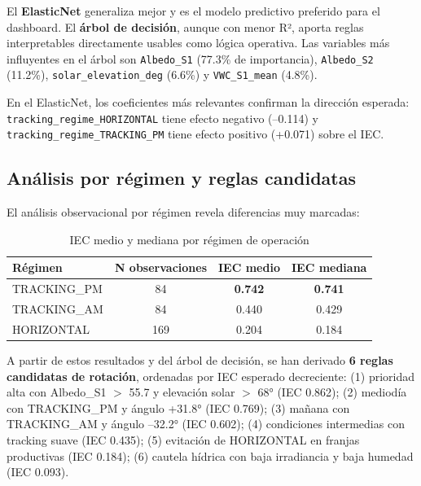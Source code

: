\documentclass[12pt,a4paper]{article}
\begin{document}
El \textbf{ElasticNet} generaliza mejor y es el modelo predictivo preferido para el dashboard. El \textbf{árbol de decisión}, aunque con menor R², aporta reglas interpretables directamente usables como lógica operativa. Las variables más influyentes en el árbol son \texttt{Albedo\_S1} (77.3\% de importancia), \texttt{Albedo\_S2} (11.2\%), \texttt{solar\_elevation\_deg} (6.6\%) y \texttt{VWC\_S1\_mean} (4.8\%).

En el ElasticNet, los coeficientes más relevantes confirman la dirección esperada: \texttt{tracking\_regime\_HORIZONTAL} tiene efecto negativo (--0.114) y \texttt{tracking\_regime\_TRACKING\_PM} tiene efecto positivo (+0.071) sobre el IEC.

\subsection{Análisis por régimen y reglas candidatas}

El análisis observacional por régimen revela diferencias muy marcadas:

\begin{table}[H]
\centering
\caption{IEC medio y mediana por régimen de operación}
\label{tab:regime_s2}
\renewcommand{\arraystretch}{1.3}
\begin{tabular}{lccc}
\toprule
\textbf{Régimen} & \textbf{N observaciones} & \textbf{IEC medio} & \textbf{IEC mediana} \\
\midrule
TRACKING\_PM & 84  & \textbf{0.742} & \textbf{0.741} \\
TRACKING\_AM & 84  & 0.440          & 0.429          \\
HORIZONTAL   & 169 & 0.204          & 0.184          \\
\bottomrule
\end{tabular}
\end{table}

A partir de estos resultados y del árbol de decisión, se han derivado \textbf{6 reglas candidatas de rotación}, ordenadas por IEC esperado decreciente: (1) prioridad alta con Albedo\_S1 $>$ 55.7 y elevación solar $>$ 68° (IEC 0.862); (2) mediodía con TRACKING\_PM y ángulo +31.8° (IEC 0.769); (3) mañana con TRACKING\_AM y ángulo --32.2° (IEC 0.602); (4) condiciones intermedias con tracking suave (IEC 0.435); (5) evitación de HORIZONTAL en franjas productivas (IEC 0.184); (6) cautela hídrica con baja irradiancia y baja humedad (IEC 0.093).

\newpage
\end{document}
